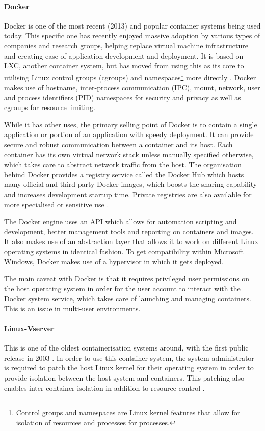 \paragraph{Docker} \label{container:docker}
Docker is one of the most recent (2013) and popular container systems being used today. This specific one has recently enjoyed massive adoption by various types of companies and research groups, helping replace virtual machine infrastructure and creating ease of application development and deployment. It is based on LXC, another container system, but has moved from using this as its core to utilising Linux control groups (cgroups) and namespaces\footnote{Control groups and namespaces are Linux kernel features that allow for isolation of resources and processes for processes.} more directly \parencite{merkel2014docker}. Docker makes use of hostname, inter-process communication (IPC), mount, network, user and process identifiers (PID) namespaces \parencite{bui2015analysis} for security and privacy as well as cgroups for resource limiting.

While it has other uses, the primary selling point of Docker is to contain a single application or portion of an application with speedy deployment. It can provide secure and robust communication between a container and its host. Each container has its own virtual network stack unless manually specified otherwise, which takes care to abstract network traffic from the host. The organisation behind Docker provides a registry service called the Docker Hub which hosts many official and third-party Docker images, which boosts the sharing capability and increases development startup time. Private registries are also available for more specialised or sensitive use \parencite{boettiger2015introduction}.

The Docker engine uses an API which allows for automation scripting and development, better management tools and reporting on containers and images. It also makes use of an abstraction layer that allows it to work on different Linux operating systems in identical fashion. To get compatibility within Microsoft Windows, Docker makes use of a hypervisor in which it gets deployed.

The main caveat with Docker is that it requires privileged user permissions on the host operating system in order for the user account to interact with the Docker system service, which takes care of launching and managing containers. This is an issue in multi-user environments.

\paragraph{Linux-Vserver} 
This is one of the oldest containerisation systems around, with the first public release in 2003 \citep{linuxvserver}. In order to use this container system, the system administrator is required to patch the host Linux kernel for their operating system in order to provide isolation between the host system and containers. This patching also enables inter-container isolation in addition to resource control \parencite{quetier2007scalability}.

